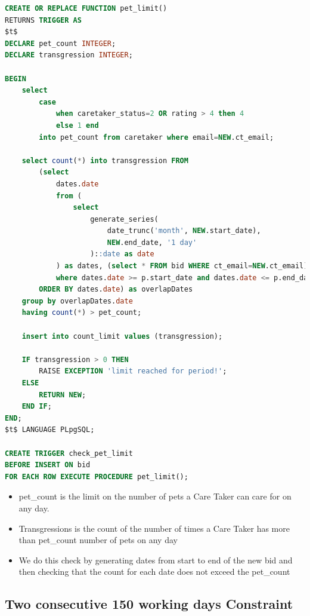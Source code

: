 \documentclass[
  paper=a4,
  ,captions=tableheading
]{scrartcl}
\providecommand{\tightlist}{%
  \setlength{\itemsep}{0pt}\setlength{\parskip}{0pt}}
\begin{document}
\begin{lstlisting}[language=SQL]
CREATE OR REPLACE FUNCTION pet_limit()
RETURNS TRIGGER AS 
$t$
DECLARE pet_count INTEGER;
DECLARE transgression INTEGER;

BEGIN
    select 
        case 
            when caretaker_status=2 OR rating > 4 then 4
            else 1 end
        into pet_count from caretaker where email=NEW.ct_email;

    select count(*) into transgression FROM 
        (select
            dates.date
            from (
                select                                                                              
                    generate_series(
                        date_trunc('month', NEW.start_date),
                        NEW.end_date, '1 day'
                    )::date as date
            ) as dates, (select * FROM bid WHERE ct_email=NEW.ct_email) as p
            where dates.date >= p.start_date and dates.date <= p.end_date 
        ORDER BY dates.date) as overlapDates
    group by overlapDates.date
    having count(*) > pet_count;

    insert into count_limit values (transgression);

    IF transgression > 0 THEN
        RAISE EXCEPTION 'limit reached for period!';
    ELSE
        RETURN NEW;
    END IF;
END;
$t$ LANGUAGE PLpgSQL;

CREATE TRIGGER check_pet_limit
BEFORE INSERT ON bid
FOR EACH ROW EXECUTE PROCEDURE pet_limit();
\end{lstlisting}

\begin{itemize}
\tightlist
\item
  pet\_count is the limit on the number of pets a Care Taker can care
  for on any day.
\item
  Transgressions is the count of the number of times a Care Taker has
  more than pet\_count number of pets on any day
\item
  We do this check by generating dates from start to end of the new bid
  and then checking that the count for each date does not exceed the
  pet\_count
\end{itemize}

\hypertarget{two-consecutive-150-working-days-constraint}{%
\subsection{Two consecutive 150 working days
Constraint}\label{two-consecutive-150-working-days-constraint}}
\end{document}
